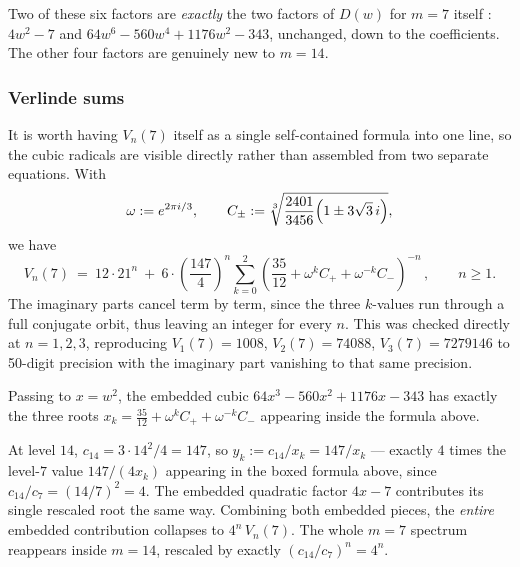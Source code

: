 \documentclass[11pt,reqno]{amsart}
\theoremstyle{remark}
\begin{document}
Two of these six factors are \emph{exactly} the two factors of $D(w)$ for $m=7$ itself
: $4w^2-7$ and $64w^6-560w^4+1176w^2-343$, unchanged, down to the coefficients. The other four factors are genuinely new to
$m=14$.

\subsubsection*{Verlinde sums}
It is worth having $V_n(7)$ itself as a single self-contained formula into one line, so the cubic radicals are visible directly rather than assembled from two
separate equations. With
$$
\omega := e^{2\pi i/3}, \qquad
C_\pm := \sqrt[3]{\dfrac{2401}{3456}\Bigl(1 \pm 3\sqrt3\,i\Bigr)},
$$
we have
$$
V_n(7) \ = \ 12\cdot21^n \ + \ 6\cdot\left(\frac{147}{4}\right)^n\sum_{k=0}^{2}\left(\dfrac{35}{12}+\omega^k C_+ + \omega^{-k}C_-\right) ^{-n}\,,
\qquad n\ge1.
$$
The imaginary parts cancel term by term, since the three $k$-values run through a full conjugate
orbit, thus leaving an integer for every $n$.  This was checked directly at $n=1,2,3$, reproducing
$V_1(7)=1008$, $V_2(7)=74088$, $V_3(7)=7279146$ to 50-digit precision with the imaginary part
vanishing to that same precision.
\medskip

Passing to $x=w^2$, the embedded cubic $64x^3-560x^2+1176x-343$ has exactly the three roots
$x_k = \tfrac{35}{12}+\omega^k C_+ + \omega^{-k}C_-$ appearing inside the formula above.

At level $14$, $c_{14}=3\cdot14^2/4=147$, so $y_k := c_{14}/x_k = 147/x_k$ --- exactly $4$ times
the level-$7$ value $147/(4x_k)$ appearing in the boxed formula above, since $c_{14}/c_7 =
(14/7)^2=4$. The embedded quadratic factor $4x-7$ contributes its single rescaled root the same
way. Combining both embedded pieces, the \emph{entire} embedded contribution collapses to
$ 4^n\,V_n(7)$.
The whole $m=7$ spectrum reappears inside $m=14$, rescaled by exactly $(c_{14}/c_7)^n=4^n$.
\end{document}

